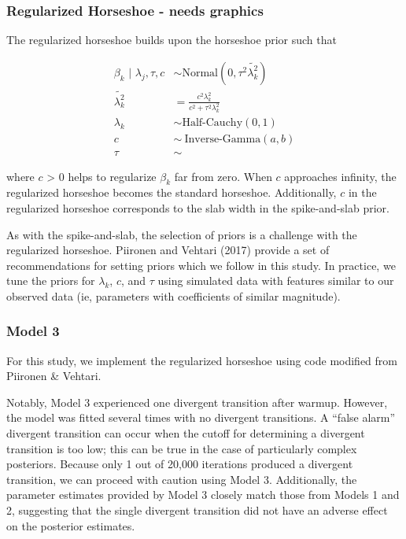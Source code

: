 \documentclass[
]{article}
\begin{document}
\hypertarget{regularized-horseshoe---needs-graphics}{%
\subsubsection{Regularized Horseshoe - needs
graphics}\label{regularized-horseshoe---needs-graphics}}

The regularized horseshoe builds upon the horseshoe prior such that

\[
\begin{aligned}
\beta_k \text{ | } \lambda_j, \tau, c & \sim \text{Normal}(0, \tau^2 \tilde{\lambda_k^2}) \\
\tilde{\lambda_k^2} & = \frac{c^2\lambda_k^2}{c^2 + \tau^2\lambda_k^2} \\
\lambda_k & \sim \text{Half-Cauchy}(0, 1) \\
c & \sim ~ \text{Inverse-Gamma}(a, b) \\
\tau & \sim 
\end{aligned}
\]

where \(c\) \textgreater{} 0 helps to regularize \(\beta_k\) far from
zero. When \(c\) approaches infinity, the regularized horseshoe becomes
the standard horseshoe. Additionally, \(c\) in the regularized horseshoe
corresponds to the slab width in the spike-and-slab prior.

As with the spike-and-slab, the selection of priors is a challenge with
the regularized horseshoe. Piironen and Vehtari (2017) provide a set of
recommendations for setting priors which we follow in this study. In
practice, we tune the priors for \(\lambda_k\), \(c\), and \(\tau\)
using simulated data with features similar to our observed data (ie,
parameters with coefficients of similar magnitude).

\hypertarget{model-3}{%
\subsubsection{Model 3}\label{model-3}}

For this study, we implement the regularized horseshoe using code
modified from Piironen \& Vehtari.

Notably, Model 3 experienced one divergent transition after warmup.
However, the model was fitted several times with no divergent
transitions. A ``false alarm'' divergent transition can occur when the
cutoff for determining a divergent transition is too low; this can be
true in the case of particularly complex posteriors. Because only 1 out
of 20,000 iterations produced a divergent transition, we can proceed
with caution using Model 3. Additionally, the parameter estimates
provided by Model 3 closely match those from Models 1 and 2, suggesting
that the single divergent transition did not have an adverse effect on
the posterior estimates.
\end{document}
